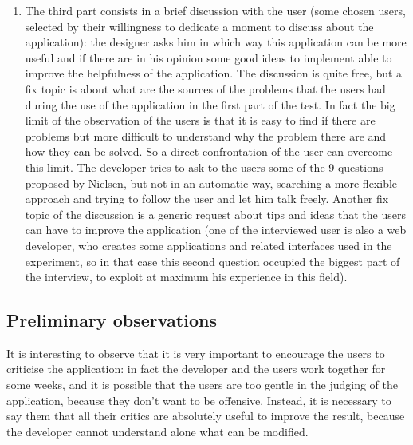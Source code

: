 \begin{enumerate}
\item 
The third part consists in a brief discussion with the user (some chosen users, selected by their willingness to dedicate a moment to discuss about the application): the designer asks him in which way this application can be more useful and if there are in his opinion some good ideas to implement able to improve the helpfulness of the application. The discussion is quite free, but a fix topic is about what are the sources of the problems that the users had during the use of the application in the first part of the test. In fact the big limit of the observation of the users is that it is easy to find if there are problems but more difficult to understand why the problem there are and how they can be solved. So a direct confrontation of the user can overcome this limit. 
The developer tries to ask to the users some of the 9 questions proposed by Nielsen, but not in an automatic way, searching a more flexible approach and trying to follow the user and let him talk freely.
Another fix topic of the discussion is a generic request about tips and ideas that the users can have to improve the application (one of the interviewed user is also a web developer, who creates some applications and related interfaces used in the experiment, so in that case this second question occupied the biggest part of the interview, to exploit at maximum his experience in this field). 

\end{enumerate} 

\subsection{Preliminary observations}
It is interesting to observe that it is very important to encourage the users to criticise the application: in fact the developer and the users work together for some weeks, and it is possible that the users are too gentle in the judging of the application, because they don't want to be offensive. Instead, it is necessary to say them that all their critics are absolutely useful to improve the result, because the developer cannot understand alone what can be modified. 
 

